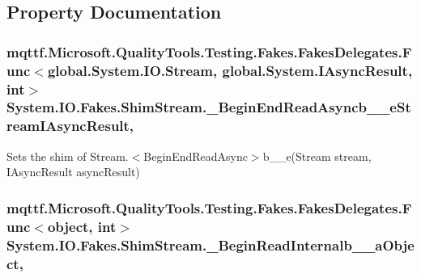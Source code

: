 \subsection{Property Documentation}
\hypertarget{class_system_1_1_i_o_1_1_fakes_1_1_shim_stream_ad65a7a7a8e568e732e497b6447c33548}{
\subsubsection[{\-\_\-\-Begin\-End\-Read\-Asyncb\-\_\-\-\_\-e\-Stream\-I\-Async\-Result}]{\setlength{\rightskip}{0pt plus 5cm}mqttf.\-Microsoft.\-Quality\-Tools.\-Testing.\-Fakes.\-Fakes\-Delegates.\-Func$<$global.\-System.\-I\-O.\-Stream, global.\-System.\-I\-Async\-Result, int$>$ System.\-I\-O.\-Fakes.\-Shim\-Stream.\-\_\-\-Begin\-End\-Read\-Asyncb\-\_\-\-\_\-e\-Stream\-I\-Async\-Result\hspace{0.3cm}{\ttfamily [static]}, {\ttfamily [set]}}}\label{class_system_1_1_i_o_1_1_fakes_1_1_shim_stream_ad65a7a7a8e568e732e497b6447c33548}


Sets the shim of Stream.$<$Begin\-End\-Read\-Async$>$b\-\_\-\-\_\-e(\-Stream stream, I\-Async\-Result async\-Result)

\hypertarget{class_system_1_1_i_o_1_1_fakes_1_1_shim_stream_a4ceb078f96effec4fbbf897717deaf81}{
\subsubsection[{\-\_\-\-Begin\-Read\-Internalb\-\_\-\-\_\-a\-Object}]{\setlength{\rightskip}{0pt plus 5cm}mqttf.\-Microsoft.\-Quality\-Tools.\-Testing.\-Fakes.\-Fakes\-Delegates.\-Func$<$object, int$>$ System.\-I\-O.\-Fakes.\-Shim\-Stream.\-\_\-\-Begin\-Read\-Internalb\-\_\-\-\_\-a\-Object\hspace{0.3cm}{\ttfamily [static]}, {\ttfamily [set]}}}\label{class_system_1_1_i_o_1_1_fakes_1_1_shim_stream_a4ceb078f96effec4fbbf897717deaf81}


